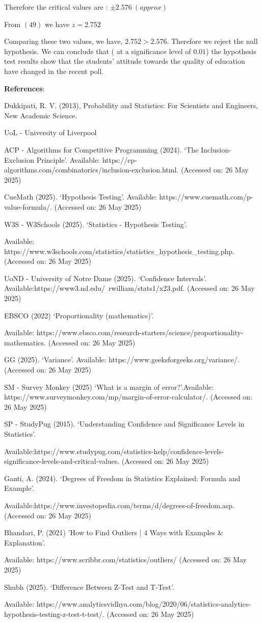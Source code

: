 \documentclass[a4paper]{report}
\begin{document}
Therefore the critical values are : $\pm 2.576\ (approx)$

From $(49)$ we have $z=2.752$

Comparing these two values, we have, $2.752>2.576$. Therefore we reject the null hypothesis.
We can conclude that ( at a significance level of $0.01$) the hypothesis test results show that the students' attitude towards the quality of education have changed in the recent poll.







\newpage
\textbf{References}:

Dukkipati, R. V. (2013), Probability and Statistics: For Scientists and Engineers, New Academic Science.

UoL - University of Liverpool

ACP - Algorithms for Competitive Programming (2024). ‘The Inclusion-Exclusion Principle’. Available: https://cp-algorithms.com/combinatorics/inclusion-exclusion.html. (Accessed on: 26 May 2025)

CueMath (2025). ‘Hypothesis Testing’. Available: https://www.cuemath.com/p-value-formula/. (Accessed on: 26 May 2025)

W3S - W3Schools (2025). ‘Statistics - Hypothesis Testing’. 

Available: https://www.w3schools.com/statistics/statistics\_hypothesis\_testing.php. (Accessed on: 26 May 2025)

UoND - University of Notre Dame (2025). ‘Confidence Intervals’.
Available:https://www3.nd.edu/~rwilliam/stats1/x23.pdf. (Accessed on: 26 May 2025)

EBSCO (2022) ‘Proportionality (mathematics)’. 

Available: https://www.ebsco.com/research-starters/science/proportionality-mathematics. (Accessed on: 26 May 2025)

GG (2025). ‘Variance’. Available: https://www.geeksforgeeks.org/variance/. (Accessed on: 26 May 2025)

SM - Survey Monkey (2025) ‘What is a margin of error?’.Available: https://www.surveymonkey.com/mp/margin-of-error-calculator/. (Accessed on: 26 May 2025)

SP - StudyPug (2015). ‘Understanding Confidence and Significance Levels in Statistics’. 

Available:https://www.studypug.com/statistics-help/confidence-levels-significance-levels-and-critical-values. 
(Accessed on: 26 May 2025)

Ganti, A. (2024). ‘Degrees of Freedom in Statistics Explained: Formula and Example’. 

Available:https://www.investopedia.com/terms/d/degrees-of-freedom.asp. (Accessed on: 26 May 2025)

Bhandari, P. (2021) ’How to Find Outliers | 4 Ways with Examples & Explanation’. 

Available: https://www.scribbr.com/statistics/outliers/ (Accessed on: 26 May 2025)

Shubh (2025). ‘Difference Between Z-Test and T-Test’. 

Available: https://www.analyticsvidhya.com/blog/2020/06/statistics-analytics-hypothesis-testing-z-test-t-test/. (Accessed on: 26 May 2025)
\end{document}
